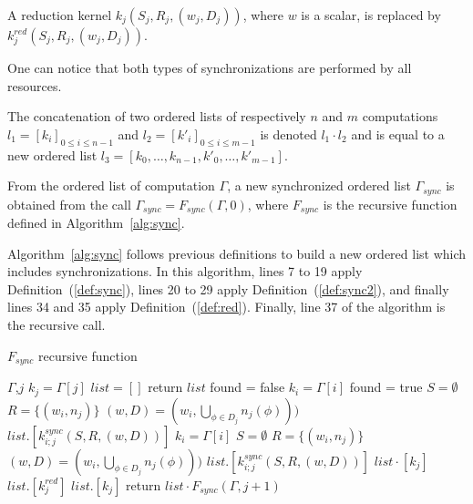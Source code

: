 \begin{mydef}
A reduction kernel $k_j(S_j,R_j,(w_j,D_j))$, where $w$ is a scalar, is replaced by $k^{red}_j(S_j,R_j,(w_j,D_j))$.
\label{def:red}
\end{mydef}

One can notice that both types of synchronizations are performed by all resources.

\begin{mydef}
The concatenation of two ordered lists of respectively $n$ and $m$ computations $l_1=[k_i]_{0 \leq i \leq n-1}$ and $l_2=[k'_i]_{0 \leq i \leq m-1}$ is denoted $l_1 \cdot l_2$ and is equal to a new ordered list $l_3=[k_0,\dots,k_{n-1},k'_0,\dots,k'_{m-1}]$.
\end{mydef}

\begin{mydef}
From the ordered list of computation $\Gamma$, a new synchronized ordered list $\Gamma_{sync}$ is obtained from the call $\Gamma_{sync} = F_{sync}(\Gamma,0)$, where $F_{sync}$ is the recursive function defined in Algorithm~\ref{alg:sync}.
\end{mydef}

Algorithm~\ref{alg:sync} follows previous definitions to build a new ordered list which includes synchronizations. In this algorithm, lines 7 to 19 apply Definition~(\ref{def:sync}), lines 20 to 29 apply Definition~(\ref{def:sync2}), and finally lines 34 and 35 apply Definition~(\ref{def:red}). Finally, line 37 of the algorithm is the recursive call.

\begin{algorithm}
\caption{$F_{sync}$ recursive function}
\label{alg:sync}
\begin{algorithmic}[1]
 {$\Gamma$,$j$}
\State $k_j = \Gamma[j]$
\State $list = []$
\State return $list$
\State found = false
\State $k_i = \Gamma[i]$
\State found = true
\State $S = \emptyset$
\State $R = \{(w_i,n_j)\}$
\State $(w,D) = (w_i,\bigcup_{\phi \in D_j} n_j(\phi)))$
\State $list.[k_{i;j}^{sync}(S,R,(w,D))]$%
\EndIf
\EndFor
{}
\State $k_i = \Gamma[i]$
\State $S = \emptyset$
\State $R = \{(w_i,n_j)\}$
\State $(w,D) = (w_i,\bigcup_{\phi \in D_j} n_j(\phi)))$
\State $list.[k_{i;j}^{sync}(S,R,(w,D))]$%
\EndIf
\EndFor
\EndIf
\State $list \cdot [k_j]$
\EndFor
{}
\State $list.[k^{red}_j]$
\Else
\State $list.[k_j]$
\EndIf
\State return $list \cdot F_{sync}(\Gamma,j+1)$
\EndProcedure
\end{algorithmic}
\end{algorithm}



